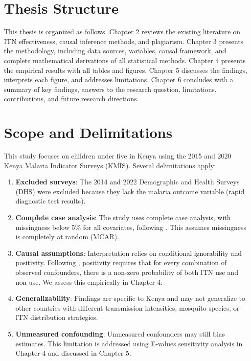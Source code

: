 \section{Thesis Structure}

This thesis is organized as follows. Chapter 2 reviews the existing literature on ITN effectiveness, causal inference methods, and plagiarism. Chapter 3 presents the methodology, including data sources, variables, causal framework, and complete mathematical derivations of all statistical methods. Chapter 4 presents the empirical results with all tables and figures. Chapter 5 discusses the findings, interprets each figure, and addresses limitations. Chapter 6 concludes with a summary of key findings, answers to the research question, limitations, contributions, and future research directions.

\section{Scope and Delimitations}

This study focuses on children under five in Kenya using the 2015 and 2020 Kenya Malaria Indicator Surveys (KMIS). Several delimitations apply:

\begin{enumerate}
	\item \textbf{Excluded surveys}: The 2014 and 2022 Demographic and Health Surveys (DHS) were excluded because they lack the malaria outcome variable (rapid diagnostic test results).
	
	\item \textbf{Complete case analysis}: The study uses complete case analysis, with missingness below 5\% for all covariates, following \citet{little2019statistical}. This assumes missingness is completely at random (MCAR).
	
	\item \textbf{Causal assumptions}: Interpretation relies on conditional ignorability and positivity. Following \citet{westreich2010invited}, positivity requires that for every combination of observed confounders, there is a non-zero probability of both ITN use and non-use. We assess this empirically in Chapter 4.
	
	\item \textbf{Generalizability}: Findings are specific to Kenya and may not generalize to other countries with different transmission intensities, mosquito species, or ITN distribution strategies.
	
	\item \textbf{Unmeasured confounding}: Unmeasured confounders may still bias estimates. This limitation is addressed using E-values sensitivity analysis in Chapter 4 and discussed in Chapter 5.
\end{enumerate}